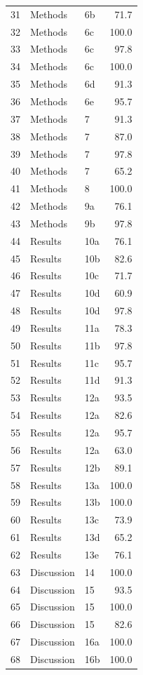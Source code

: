 \begin{longtable}{rllr}
31 & Methods & 6b & 71.7 \\
32 & Methods & 6c & 100.0 \\
33 & Methods & 6c & 97.8 \\
34 & Methods & 6c & 100.0 \\
35 & Methods & 6d & 91.3 \\
36 & Methods & 6e & 95.7 \\
37 & Methods & 7 & 91.3 \\
38 & Methods & 7 & 87.0 \\
39 & Methods & 7 & 97.8 \\
40 & Methods & 7 & 65.2 \\
41 & Methods & 8 & 100.0 \\
42 & Methods & 9a & 76.1 \\
43 & Methods & 9b & 97.8 \\
44 & Results & 10a & 76.1 \\
45 & Results & 10b & 82.6 \\
46 & Results & 10c & 71.7 \\
47 & Results & 10d & 60.9 \\
48 & Results & 10d & 97.8 \\
49 & Results & 11a & 78.3 \\
50 & Results & 11b & 97.8 \\
51 & Results & 11c & 95.7 \\
52 & Results & 11d & 91.3 \\
53 & Results & 12a & 93.5 \\
54 & Results & 12a & 82.6 \\
55 & Results & 12a & 95.7 \\
56 & Results & 12a & 63.0 \\
57 & Results & 12b & 89.1 \\
58 & Results & 13a & 100.0 \\
59 & Results & 13b & 100.0 \\
60 & Results & 13c & 73.9 \\
61 & Results & 13d & 65.2 \\
62 & Results & 13e & 76.1 \\
63 & Discussion & 14 & 100.0 \\
64 & Discussion & 15 & 93.5 \\
65 & Discussion & 15 & 100.0 \\
66 & Discussion & 15 & 82.6 \\
67 & Discussion & 16a & 100.0 \\
68 & Discussion & 16b & 100.0 \\

\end{longtable}
